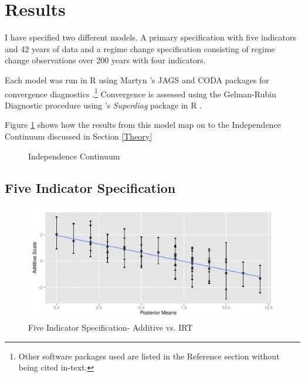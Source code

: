 \documentclass[12pt]{article}
\begin{document}
\section{Results}\label{Results}
I have specified two different models.  A primary specification with five indicators and 42 years of data and a regime change specification consisting of regime change observations over 200 years with four indicators.

Each model was run in R using Martyn \citeauthor{r-rjags}'s JAGS and CODA packages for convergence diagnostics \citep{R,r-CODA,r-rjags}.\footnote{Other software packages used are listed in the Reference section without being cited in-text.}  Convergence is assessed using the Gelman-Rubin Diagnostic procedure using \citeauthor{r-superdiag}'s \textit{Superdiag} package in R \citep{Gelman1992,R}.

\nocite{R,r-CODA,r-Foreign,r-R2jags,r-ggplot2,r-dplyr,r-rjagsr-doParallel,r-rcurl,r-random,r-superdiag,r-polycor}

Figure \ref{continuumresults} shows how the results from this model map on to the Independence Continuum discussed in Section \ref{Theory}

\begin{figure}[tbh]\centering\caption{Independence Continuum}\label{continuumresults}
\end{figure}

\subsection{Five Indicator Specification}
\begin{figure}
	\centering
	\caption{Five Indicator Specification- Additive vs. IRT}
	\label{fig:fiveind_additive_ggplot}
	\includegraphics[width=0.7\linewidth]{graphics/fiveind/fiveind_additive_ggplot}
\end{figure}
\end{document}
